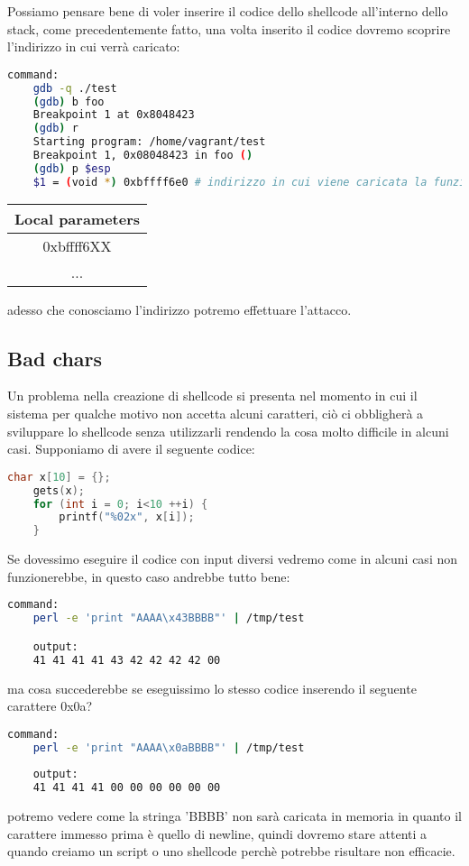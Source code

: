 Possiamo pensare bene di voler inserire il codice dello shellcode all'interno dello stack, come precedentemente fatto, una volta inserito il codice dovremo scoprire l'indirizzo in cui verrà caricato:
\begin{lstlisting}[language=bash]
    command:
    gdb -q ./test
    (gdb) b foo
    Breakpoint 1 at 0x8048423
    (gdb) r
    Starting program: /home/vagrant/test
    Breakpoint 1, 0x08048423 in foo ()
    (gdb) p $esp
    $1 = (void *) 0xbffff6e0 # indirizzo in cui viene caricata la funzione
\end{lstlisting}

\begin{center}
    \begin{table}[h!]
        \centering
        \begin{tabular}{|c|}
            \hline
            Local parameters \\
            \hline
            0xbffff6XX \\
            \hline
            ... \\
            \hline
        \end{tabular}
    \end{table}
\end{center}
adesso che conosciamo l'indirizzo potremo effettuare l'attacco.

\subsection{Bad chars}
Un problema nella creazione di shellcode si presenta nel momento in cui il sistema per qualche motivo non accetta alcuni caratteri, ciò ci obbligherà a sviluppare lo shellcode senza utilizzarli rendendo la cosa molto difficile in alcuni casi.
Supponiamo di avere il seguente codice:
\begin{lstlisting}[language=C]
    char x[10] = {};
    gets(x);
    for (int i = 0; i<10 ++i) {
        printf("%02x", x[i]);
    }
\end{lstlisting}

Se dovessimo eseguire il codice con input diversi vedremo come in alcuni casi non funzionerebbe, in questo caso andrebbe tutto bene:
\begin{lstlisting}[language=bash]
    command:
    perl -e 'print "AAAA\x43BBBB"' | /tmp/test

    output:
    41 41 41 41 43 42 42 42 42 00
\end{lstlisting}
ma cosa succederebbe se eseguissimo lo stesso codice inserendo il seguente carattere 0x0a?
\begin{lstlisting}[language=bash]
    command:
    perl -e 'print "AAAA\x0aBBBB"' | /tmp/test
    
    output:
    41 41 41 41 00 00 00 00 00 00
\end{lstlisting}
potremo vedere come la stringa 'BBBB' non sarà caricata in memoria in quanto il carattere immesso prima è quello di newline, quindi dovremo stare attenti a quando creiamo un script o uno shellcode perchè potrebbe risultare non efficacie.

